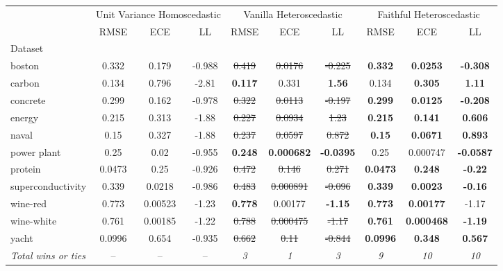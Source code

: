 \begin{tabular}{l|ccc|ccc|ccc}
\toprule
 & \multicolumn{3}{|c}{Unit Variance Homoscedastic} & \multicolumn{3}{|c}{Vanilla Heteroscedastic} & \multicolumn{3}{|c}{Faithful Heteroscedastic} \\
 & RMSE & ECE & LL & RMSE & ECE & LL & RMSE & ECE & LL \\
Dataset &  &  &  &  &  &  &  &  &  \\
\midrule
boston & 0.332 & 0.179 & -0.988 & \sout{0.419} & \sout{0.0176} & \sout{-0.225} & \textbf{0.332} & \textbf{0.0253} & \textbf{-0.308} \\
carbon & 0.134 & 0.796 & -2.81 & \textbf{0.117} & 0.331 & \textbf{1.56} & 0.134 & \textbf{0.305} & \textbf{1.11} \\
concrete & 0.299 & 0.162 & -0.978 & \sout{0.322} & \sout{0.0113} & \sout{-0.197} & \textbf{0.299} & \textbf{0.0125} & \textbf{-0.208} \\
energy & 0.215 & 0.313 & -1.88 & \sout{0.227} & \sout{0.0934} & \sout{1.23} & \textbf{0.215} & \textbf{0.141} & \textbf{0.606} \\
naval & 0.15 & 0.327 & -1.88 & \sout{0.237} & \sout{0.0597} & \sout{0.872} & \textbf{0.15} & \textbf{0.0671} & \textbf{0.893} \\
power plant & 0.25 & 0.02 & -0.955 & \textbf{0.248} & \textbf{0.000682} & \textbf{-0.0395} & 0.25 & 0.000747 & \textbf{-0.0587} \\
protein & 0.0473 & 0.25 & -0.926 & \sout{0.472} & \sout{0.146} & \sout{0.271} & \textbf{0.0473} & \textbf{0.248} & \textbf{-0.22} \\
superconductivity & 0.339 & 0.0218 & -0.986 & \sout{0.483} & \sout{0.000891} & \sout{-0.096} & \textbf{0.339} & \textbf{0.0023} & \textbf{-0.16} \\
wine-red & 0.773 & 0.00523 & -1.23 & \textbf{0.778} & 0.00177 & \textbf{-1.15} & \textbf{0.773} & \textbf{0.00177} & -1.17 \\
wine-white & 0.761 & 0.00185 & -1.22 & \sout{0.788} & \sout{0.000475} & \sout{-1.17} & \textbf{0.761} & \textbf{0.000468} & \textbf{-1.19} \\
yacht & 0.0996 & 0.654 & -0.935 & \sout{0.662} & \sout{0.11} & \sout{-0.844} & \textbf{0.0996} & \textbf{0.348} & \textbf{0.567} \\
\textit{{Total wins or ties}} & -- & -- & -- & \textit{3} & \textit{1} & \textit{3} & \textit{9} & \textit{10} & \textit{10} \\
\bottomrule
\end{tabular}
